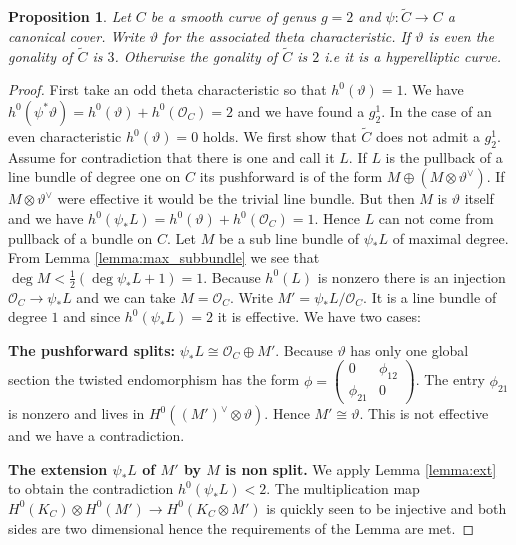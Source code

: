 \documentclass[12pt]{extarticle}
\newtheorem{proposition}[theorem]{Proposition}
\theoremstyle{definition}
\numberwithin{theorem}{section}
\newcommand{\OO}{\mathcal{O}}
\renewcommand{\tilde}{\widetilde}		%
\begin{document}
\begin{proposition}\label{prop:g=2}
Let $C$ be a smooth curve of genus $g = 2$ and $\psi: \tilde{C} \rightarrow C$ a canonical cover. Write $\vartheta$ for the associated theta characteristic. 
If $\vartheta$ is even the gonality of $\tilde{C}$ is $3$.
Otherwise the gonality of $\tilde{C}$ is $2$ i.e it is a hyperelliptic curve.  
\end{proposition}
\begin{proof}
First take an odd theta characteristic so that $h^0(\vartheta) = 1$. We have $h^0(\psi^*\vartheta) = h^0(\vartheta) + h^0(\OO_C) = 2$ and we have found a $g^1_2$.
In the case of an even characteristic $h^0(\vartheta)=0$ holds. We first show that $\tilde{C}$ does not admit a $g^1_2$. Assume for contradiction that there is one and call it $L$. If $L$ is the pullback of a line bundle of degree one on $C$ its pushforward is of the form $M \oplus (M \otimes \vartheta^\vee)$. If $M \otimes \vartheta^\vee$ were effective it would be the trivial line bundle. But then $M$ is $\vartheta$ itself and we have $h^0(\psi_*L) = h^0(\vartheta) + h^0(\OO_C) = 1$. Hence $L$ can not come from pullback of a bundle on $C$. Let $M$ be a sub line bundle of $\psi_*L$ of maximal degree. From Lemma \ref{lemma:max_subbundle} we see that $\deg M < \frac{1}{2}(\deg \psi_* L + 1) = 1$. Because $h^0(L)$ is nonzero there is an injection $\OO_C \rightarrow \psi_*L$ and we can take $M = \OO_C$. Write $M' = \psi_*L / \OO_C$. It is a line bundle of degree $1$ and since $h^0(\psi_*L) =2 $ it is effective. We have two cases:

\textbf{The pushforward splits:} $\psi_*L \cong \OO_C \oplus M'$. Because $\vartheta$ has only one global section the twisted endomorphism has the form $\phi =  \begin{pmatrix}
0 & \phi_{12} \\
\phi_{21} & 0  
\end{pmatrix}$. The entry $\phi_{21}$ is nonzero and lives in $H^0( (M')^\vee\otimes \vartheta)$. Hence $M' \cong \vartheta$. This is not effective and we have a contradiction. 

\textbf{The extension $\psi_*L$ of $M'$ by $M$ is non split.} We apply Lemma \ref{lemma:ext} to obtain the contradiction $h^0(\psi_*L) < 2$. The multiplication map $H^0(K_C) \otimes H^0(M') \rightarrow H^0(K_C \otimes M')$ is quickly seen to be injective and both sides are two dimensional hence the requirements of the Lemma are met.
\end{proof}
\end{document}

